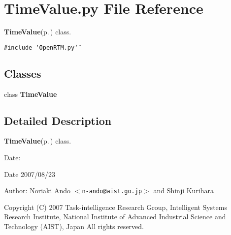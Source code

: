 \section{Time\-Value.py File Reference}
\label{TimeValue_8py}
{\bf Time\-Value}{\rm (p.\,\pageref{classTimeValue})} class. 

{\tt \#include \char`\"{}Open\-RTM.py\char`\"{}}\par
\subsection*{Classes}
\begin{CompactItemize}
\item 
class {\bf Time\-Value}
\end{CompactItemize}


\subsection{Detailed Description}
{\bf Time\-Value}{\rm (p.\,\pageref{classTimeValue})} class. 

\begin{Desc}
\item[Date:]\begin{Desc}
\item[Date]2007/08/23\end{Desc}
\end{Desc}
\begin{Desc}
\item[Author:]Noriaki Ando $<${\tt n-ando@aist.go.jp}$>$ and Shinji Kurihara\end{Desc}
Copyright (C) 2007 Task-intelligence Research Group, Intelligent Systems Research Institute, National Institute of Advanced Industrial Science and Technology (AIST), Japan All rights reserved.